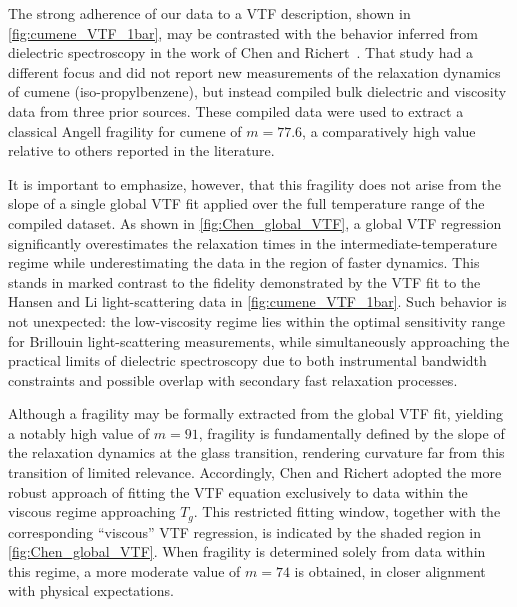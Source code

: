 \iffalse
The strong adherence of our data to a VTF description, shown in \fig \ref{fig:cumene_VTF_1bar}, may be contrasted with the behavior inferred from dielectric spectroscopy in the work of Chen and Richert~\cite{Chen}. That study had a different focus and did not report new measurements of the relaxation dynamics of cumene (iso-propylbenzene), but instead compiled bulk dielectric and viscosity data from three prior sources. These compiled data were used to extract a classical Angell fragility for cumene of $m=77.6$, a comparatively high value relative to others reported in the literature.

It is important to emphasize, however, that this fragility does not arise from the slope of a single global VTF fit applied over the full temperature range of the compiled dataset. As shown in \fig \ref{fig:Chen_global_VTF}, a global VTF regression significantly overestimates the relaxation times in the intermediate-temperature regime while underestimating the data in the region of faster dynamics. This stands in marked contrast to the fidelity demonstrated by the VTF fit to the Hansen \etal and Li \etal light-scattering data in \fig \ref{fig:cumene_VTF_1bar}. Such behavior is not unexpected: the low-viscosity regime lies within the optimal sensitivity range for Brillouin light-scattering measurements, while simultaneously approaching the practical limits of dielectric spectroscopy due to both instrumental bandwidth constraints and possible overlap with secondary fast relaxation processes.

Although a fragility may be formally extracted from the global VTF fit, yielding a notably high value of $m=91$, fragility is fundamentally defined by the slope of the relaxation dynamics at the glass transition, rendering curvature far from this transition of limited relevance. Accordingly, Chen and Richert adopted the more robust approach of fitting the VTF equation exclusively to data within the viscous regime approaching $T_g$. This restricted fitting window, together with the corresponding ``viscous'' VTF regression, is indicated by the shaded region in \fig \ref{fig:Chen_global_VTF}. When fragility is determined solely from data within this regime, a more moderate value of $m=74$ is obtained, in closer alignment with physical expectations.

